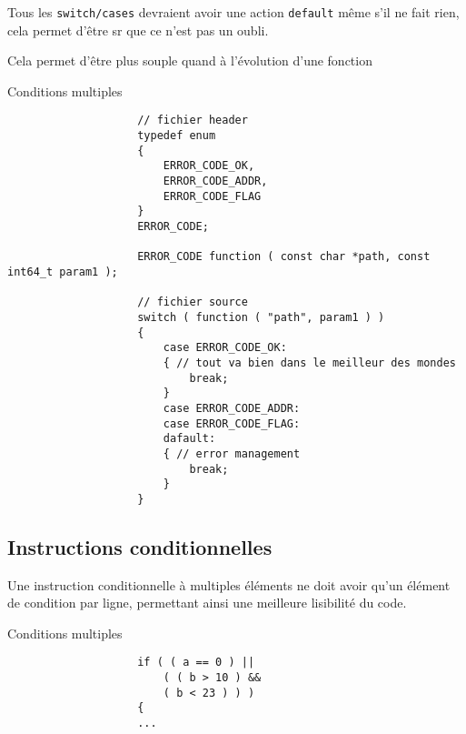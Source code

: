			Tous les \verb+switch/cases+ devraient avoir une action \verb+default+ même s'il ne fait rien, cela permet d'être sr que ce n'est pas un oubli.

			Cela permet d’être plus souple quand à l'évolution d'une fonction

			\begin{cbox}{Conditions multiples}
				\begin{verbatim}
					// fichier header
					typedef enum
					{
					    ERROR_CODE_OK,
					    ERROR_CODE_ADDR,
					    ERROR_CODE_FLAG
					}
					ERROR_CODE;

					ERROR_CODE function ( const char *path, const int64_t param1 );

					// fichier source
					switch ( function ( "path", param1 ) )
					{
					    case ERROR_CODE_OK:
					    { // tout va bien dans le meilleur des mondes
					        break;
					    }
					    case ERROR_CODE_ADDR:
					    case ERROR_CODE_FLAG:
					    dafault:
					    { // error management
					        break;
					    }
					}
				\end{verbatim}
			\end{cbox}

		\subsection{Instructions conditionnelles}
			Une instruction conditionnelle à multiples éléments ne doit avoir qu'un élément de condition par ligne, permettant ainsi une meilleure lisibilité du code.

			\begin{cbox}{Conditions multiples}
				\begin{verbatim}
					if ( ( a == 0 ) ||
					    ( ( b > 10 ) &&
					    ( b < 23 ) ) )
					{
					...
				\end{verbatim}
			\end{cbox}

	

	
	